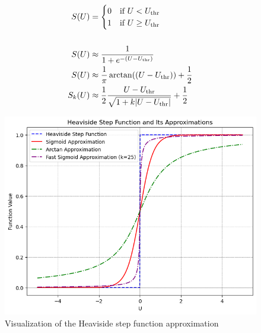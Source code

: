 \documentclass[11pt]{article}
\begin{document}
\begin{figure}[H]
  \begin{minipage}[t]{0.5\textwidth}
    \vspace{40pt} %
    $$\begin{aligned}
        S(U) & = \begin{cases}
          0 & \text{if } U < U_{\rm thr} \\
          1 & \text{if } U \geq U_{\rm thr}
        \end{cases} \\ \\
        S(U) & \approx \frac{1}{1 + e^{-(U - U_{\rm thr})}}       \\
        S(U) & \approx \frac{1}{\pi} \arctan((U - U_{\rm thr})) + \frac{1}{2} \\ 
        S_k(U) & \approx \frac{1}{2} \frac{U - U_{\rm thr}}{\sqrt{1 + k \lvert U - U_{\rm thr} \rvert}} + \frac{1}{2}
      \end{aligned}$$
  \end{minipage}
  \hfill
  \begin{minipage}[t]{0.45\textwidth}
    \vspace{0pt} %
    \centering
    \includegraphics[width=\textwidth]{./image/approx_surrogate.png}
    \caption{Visualization of the Heaviside step function approximation\cite{LIAO2023126470}}
    \label{fig:approx_surrogate}
  \end{minipage}
\end{figure}
\end{document}
